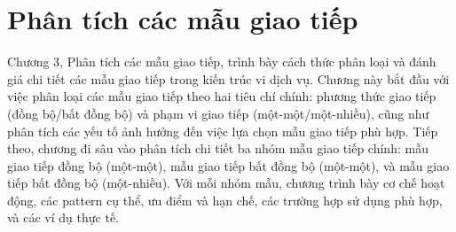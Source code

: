 \chapter{Phân tích các mẫu giao tiếp}

Chương 3, Phân tích các mẫu giao tiếp, trình bày cách thức phân loại và đánh giá chi tiết các mẫu giao tiếp trong kiến trúc vi dịch vụ. Chương này bắt đầu với việc phân loại các mẫu giao tiếp theo hai tiêu chí chính: phương thức giao tiếp (đồng bộ/bất đồng bộ) và phạm vi giao tiếp (một-một/một-nhiều), cũng như phân tích các yếu tố ảnh hưởng đến việc lựa chọn mẫu giao tiếp phù hợp. Tiếp theo, chương đi sâu vào phân tích chi tiết ba nhóm mẫu giao tiếp chính: mẫu giao tiếp đồng bộ (một-một), mẫu giao tiếp bất đồng bộ (một-một), và mẫu giao tiếp bất đồng bộ (một-nhiều). Với mỗi nhóm mẫu, chương trình bày cơ chế hoạt động, các pattern cụ thể, ưu điểm và hạn chế, các trường hợp sử dụng phù hợp, và các ví dụ thực tế.





